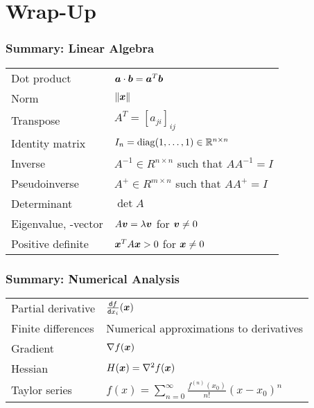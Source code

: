 \documentclass[%
  final,
  11pt, 
  show notes, %
  t, %
  fleqn, %
]{beamer}
\begin{document}
\section{Wrap-Up}

\begin{frame}
  \frametitle{Summary: Linear Algebra}
{\renewcommand{\arraystretch}{1.5}%
\begin{tabular}{ll}
Dot product & $\bm{a} \cdot \bm{b} = \bm{a}^T \bm{b}$ \\
Norm & $\left\Vert \bm{x} \right\Vert$ \\
Transpose & $A^T = \left[ a_{ji} \right]_{ij}$ \\
Identity matrix & $I_n = \operatorname{diag}( 1, \ldots, 1 ) \in \mathbb{R}^{n\times n}$ \\
Inverse & $A^{-1} \in R^{n\times n}$ such that $A A^{-1} = I$  \\
Pseudoinverse & $A^+ \in R^{m\times n}$ such that $A A^+ = I$ \\
Determinant & $\det{A}$ \\
Eigenvalue, -vector & $A \bm{v} = \lambda\bm{v}$ for $\bm{v} \neq 0$ \\
Positive definite & $\bm{x}^T A \bm{x} > 0$ for $\bm{x} \neq 0$
\end{tabular}
}
\end{frame}

\begin{frame}
  \frametitle{Summary: Numerical Analysis}
{\renewcommand{\arraystretch}{1.5}%
\begin{tabular}{ll}
Partial derivative & $\frac{\mathop{}\!\mathsf{d} f}{\mathop{}\!\mathsf{d} x_i}(\bm{x})$ \\
Finite differences & Numerical approximations to derivatives \\
Gradient & $\nabla f(\bm{x})$ \\
Hessian & $H(\bm{x}) = \nabla^2 f(\bm{x})$ \\
Taylor series & $f(x) = \sum\limits_{n=0}^{\infty}{\frac{f^{(n)}(x_0)}{n!} (x-x_0)^n}$ \\
\end{tabular}
}
\end{frame}
\end{document}
